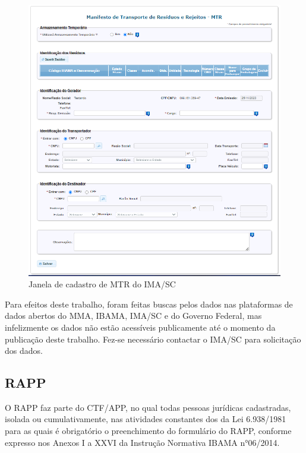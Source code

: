 \begin{figure}[htb]
	\caption{\label{fig:envio-mtr} Janela de cadastro de MTR do IMA/SC }
	\begin{center}
		\includegraphics[scale=0.6]{images/envio-mtr.png}
	\end{center}
\end{figure}

Para efeitos deste trabalho, foram feitas buscas pelos dados nas plataformas de dados abertos do \gls{MMA}, \gls{IBAMA}, \gls{IMA/SC} e do Governo Federal, mas infelizmente os dados não estão acessíveis publicamente até o momento da publicação deste trabalho. Fez-se necessário contactar o \gls{IMA/SC} para solicitação dos dados.



\subsection{RAPP}

O \gls{RAPP} faz parte do \gls{CTF/APP}, no qual todas pessoas jurídicas cadastradas, isolada ou cumulativamente, nas atividades constantes dos da Lei 6.938/1981 para as quais é obrigatório o preenchimento do formulário do \gls{RAPP}, conforme expresso nos Anexos I a XXVI da Instrução Normativa IBAMA n°06/2014. 

